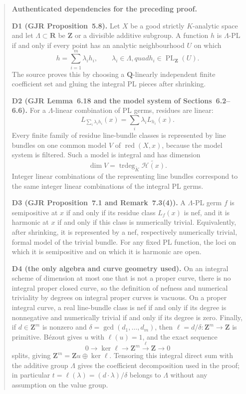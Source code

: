 \begin{quote}
\textbf{Authenticated dependencies for the preceding proof.}

\textbf{D1 (GJR Proposition~5.8).}
Let $X$ be a good strictly $K$-analytic space and let
$\Lambda\subset\mathbf R$ be $\mathbf Z$ or a divisible additive subgroup.
A function $h$ is $\Lambda$-PL if and only if every point has an analytic
neighbourhood $U$ on which
\[
                         h=\sum_{i=1}^m\lambda_i h_i,
 \qquad \lambda_i\in\Lambda,quad h_i\in\operatorname{PL}_{\mathbf Z}(U).
\]
The source proves this by choosing a $\mathbf Q$-linearly independent finite
coefficient set and gluing the integral PL pieces after shrinking.

\textbf{D2 (GJR Lemma~6.18 and the model system of Sections~6.2--6.6).}
For a $\Lambda$-linear combination of PL germs, residues are linear:
\[
                     L_{\sum_i\lambda_i h_i}(x)
                       =\sum_i\lambda_iL_{h_i}(x).
\]
Every finite family of residue line-bundle classes is represented by line
bundles on one common model $V$ of $\operatorname{red}(X,x)$, because the
model system is filtered.  Such a model is integral and has dimension
\[
             \dim V=\operatorname{trdeg}_{\widetilde K}
                         \widetilde{\mathscr H(x)}.
\]
Integer linear combinations of the representing line bundles correspond to
the same integer linear combinations of the integral PL germs.

\textbf{D3 (GJR Proposition~7.1 and Remark~7.3(4)).}
A $\Lambda$-PL germ $f$ is semipositive at $x$ if and only if its residue
class $L_f(x)$ is nef, and it is harmonic at $x$ if and only if this class is
numerically trivial.  Equivalently, after shrinking, it is represented by a
nef, respectively numerically trivial, formal model of the trivial bundle.
For any fixed PL function, the loci on which it is semipositive and on which
it is harmonic are open.

\textbf{D4 (the only algebra and curve geometry used).}
On an integral scheme of dimension at most one that is not a proper curve,
there is no integral proper closed curve, so the definition of nefness and
numerical triviality by degrees on integral proper curves is vacuous.  On a
proper integral curve, a real line-bundle class is nef if and only if its
degree is nonnegative and numerically trivial if and only if its degree is
zero.  Finally, if $d\in\mathbf Z^m$ is nonzero and
$\delta=\gcd(d_1,\ldots,d_m)$, then
$\ell=d/\delta:\mathbf Z^m\to\mathbf Z$ is primitive.  B\'ezout gives
$u$ with $\ell(u)=1$, and the exact sequence
\[
 0\longrightarrow\ker\ell\longrightarrow\mathbf Z^m
   \stackrel{\ell}{\longrightarrow}\mathbf Z\longrightarrow0
\]
splits, giving $\mathbf Z^m=\mathbf Zu\oplus\ker\ell$.  Tensoring this
integral direct sum with the additive group $\Lambda$ gives the coefficient
decomposition used in the proof; in particular
$t=\ell(\lambda)=(d\cdot\lambda)/\delta$ belongs to $\Lambda$ without any
assumption on the value group.


\end{quote}
